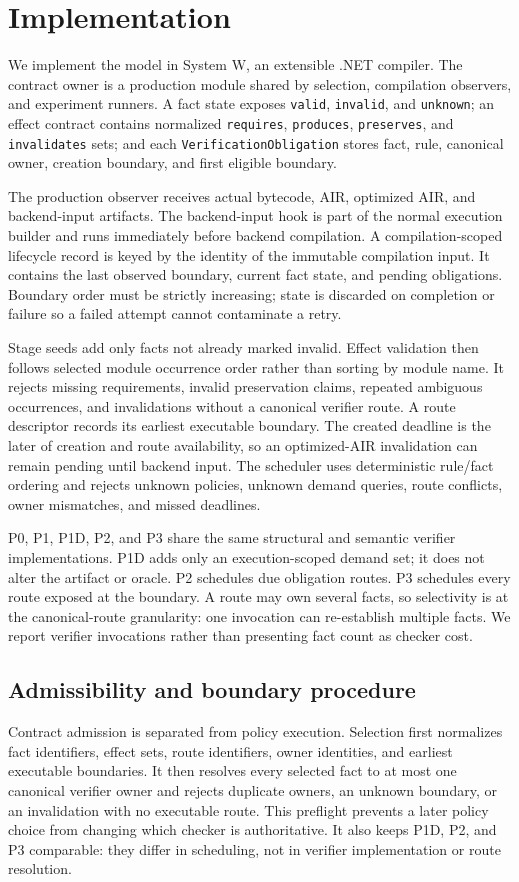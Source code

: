 \section{Implementation}
We implement the model in System W, an extensible .NET compiler. The contract owner is a production module shared by selection, compilation observers, and experiment runners. A fact state exposes \texttt{valid}, \texttt{invalid}, and \texttt{unknown}; an effect contract contains normalized \texttt{requires}, \texttt{produces}, \texttt{preserves}, and \texttt{invalidates} sets; and each \texttt{VerificationObligation} stores fact, rule, canonical owner, creation boundary, and first eligible boundary.

The production observer receives actual bytecode, AIR, optimized AIR, and backend-input artifacts. The backend-input hook is part of the normal execution builder and runs immediately before backend compilation. A compilation-scoped lifecycle record is keyed by the identity of the immutable compilation input. It contains the last observed boundary, current fact state, and pending obligations. Boundary order must be strictly increasing; state is discarded on completion or failure so a failed attempt cannot contaminate a retry.

Stage seeds add only facts not already marked invalid. Effect validation then follows selected module occurrence order rather than sorting by module name. It rejects missing requirements, invalid preservation claims, repeated ambiguous occurrences, and invalidations without a canonical verifier route. A route descriptor records its earliest executable boundary. The created deadline is the later of creation and route availability, so an optimized-AIR invalidation can remain pending until backend input. The scheduler uses deterministic rule/fact ordering and rejects unknown policies, unknown demand queries, route conflicts, owner mismatches, and missed deadlines.

P0, P1, P1D, P2, and P3 share the same structural and semantic verifier implementations. P1D adds only an execution-scoped demand set; it does not alter the artifact or oracle. P2 schedules due obligation routes. P3 schedules every route exposed at the boundary. A route may own several facts, so selectivity is at the canonical-route granularity: one invocation can re-establish multiple facts. We report verifier invocations rather than presenting fact count as checker cost.

\subsection{Admissibility and boundary procedure}
Contract admission is separated from policy execution. Selection first normalizes fact identifiers, effect sets, route identifiers, owner identities, and earliest executable boundaries. It then resolves every selected fact to at most one canonical verifier owner and rejects duplicate owners, an unknown boundary, or an invalidation with no executable route. This preflight prevents a later policy choice from changing which checker is authoritative. It also keeps P1D, P2, and P3 comparable: they differ in scheduling, not in verifier implementation or route resolution.

